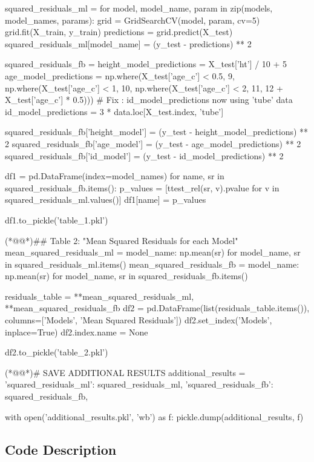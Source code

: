 \documentclass[11pt]{article}
\begin{document}
\begin{python}
squared_residuals_ml = {}
for model, model_name, param in zip(models, model_names, params):
    grid = GridSearchCV(model, param, cv=5)
    grid.fit(X_train, y_train)
    predictions = grid.predict(X_test)
    squared_residuals_ml[model_name] = (y_test - predictions) ** 2

squared_residuals_fb = {}
height_model_predictions = X_test['ht'] / 10 + 5
age_model_predictions = np.where(X_test['age_c'] < 0.5, 9,
                                 np.where(X_test['age_c'] < 1, 10, np.where(X_test['age_c'] < 2, 11,
                                                                           12 + X_test['age_c'] * 0.5)))
# Fix : id_model_predictions now using 'tube' data
id_model_predictions = 3 * data.loc[X_test.index, 'tube']

squared_residuals_fb['height_model'] = (y_test - height_model_predictions) ** 2
squared_residuals_fb['age_model'] = (y_test - age_model_predictions) ** 2
squared_residuals_fb['id_model'] = (y_test - id_model_predictions) ** 2

df1 = pd.DataFrame(index=model_names)
for name, sr in squared_residuals_fb.items():
    p_values = [ttest_rel(sr, v).pvalue for v in squared_residuals_ml.values()]
    df1[name] = p_values

df1.to_pickle('table_1.pkl')

(*@@*)## Table 2: "Mean Squared Residuals for each Model"
mean_squared_residuals_ml = {model_name: np.mean(sr) for model_name, sr in squared_residuals_ml.items()}
mean_squared_residuals_fb = {model_name: np.mean(sr) for model_name, sr in squared_residuals_fb.items()}

residuals_table = {**mean_squared_residuals_ml, **mean_squared_residuals_fb}
df2 = pd.DataFrame(list(residuals_table.items()), columns=['Models', 'Mean Squared Residuals'])
df2.set_index('Models', inplace=True)
df2.index.name = None

df2.to_pickle('table_2.pkl')

(*@@*)# SAVE ADDITIONAL RESULTS
additional_results = {
    'squared_residuals_ml': squared_residuals_ml,
    'squared_residuals_fb': squared_residuals_fb,
}

with open('additional_results.pkl', 'wb') as f:
    pickle.dump(additional_results, f)


\end{python}

\subsection{Code Description}
\end{document}
